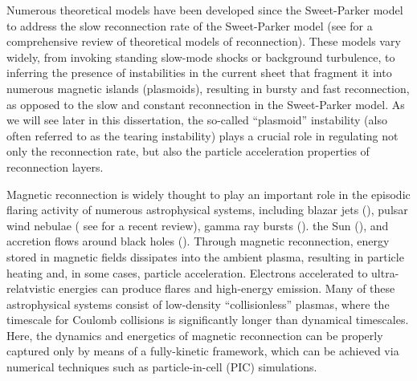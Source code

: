 Numerous theoretical models have been developed since the Sweet-Parker model to address the slow reconnection rate of the Sweet-Parker model (see \citealt{loureiro2016} for a comprehensive review of theoretical models of reconnection).  These models vary widely, from invoking standing slow-mode shocks or background turbulence, to inferring the presence of instabilities in the current sheet that fragment it into numerous magnetic islands (plasmoids), resulting in bursty and fast reconnection, as opposed to the slow and constant reconnection in the Sweet-Parker model.  As we will see later in this dissertation, the so-called ``plasmoid'' instability (also often referred to as the tearing instability) plays a crucial role in regulating not only the reconnection rate, but also the particle acceleration properties of reconnection layers.
 

Magnetic reconnection is widely thought to play an important role in the episodic flaring activity of numerous astrophysical systems, including blazar jets (\citealt{giannios2013, petropoulou2016, nalewajko2016}), pulsar wind nebulae (\citealt{coroniti1990, lyubarsky2001, zenitani2001, kirk2003, contopoulos2007, petri2008, sironi2011, cerutti2012,cerutti2014,cerutti2017, philippov2014} see \citealt{sironi2017} for a recent review), gamma ray bursts (\citealt{thompson1994, thompson2006, usov1994, spruit2001, drenkhahn2002, lyutikov2003, giannios2008}). the Sun (\citealt{forbes1996, yokoyama2001, shibata2011}), and accretion flows around black holes (\citealt{galeev1979, dimatteo1998, uzdensky2008, li2015, ball2016, li2017}).  Through magnetic reconnection, energy stored in magnetic fields dissipates into the ambient plasma, resulting in particle heating and, in some cases, particle acceleration.  Electrons accelerated to ultra-relatvistic energies can produce flares and high-energy emission.  Many of these astrophysical systems consist of low-density ``collisionless'' plasmas, where the timescale for Coulomb collisions is significantly longer than dynamical timescales.  Here, the dynamics and energetics of magnetic reconnection can be properly captured only by means of a fully-kinetic framework, which can be achieved via numerical techniques such as particle-in-cell (PIC) simulations.


